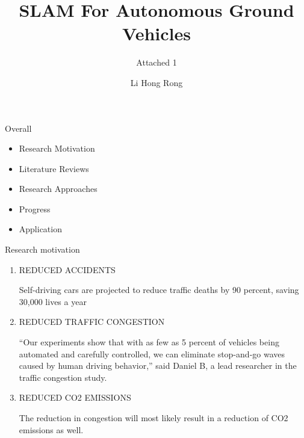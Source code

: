 \documentclass{beamer}
\title{SLAM For Autonomous Ground Vehicles}
\subtitle{Attached 1}
\author{Li Hong Rong}
\date{}
\begin{document}
\begin{frame}
\titlepage
\end{frame}


\begin{frame}[t]{Overall}
\begin{itemize}
\item Research Motivation
\item Literature Reviews
\item Research Approaches
\item Progress
\item Application
\end{itemize}
\end{frame}

\begin{frame}[t]{Research motivation}
\begin{enumerate}[1.]
\item REDUCED ACCIDENTS\\
\vspace{0.5pt}
\begin{tcolorbox}[colback=green!5!white,colframe=green!75!black]
Self-driving cars are projected to reduce traffic deaths by 90 percent, saving 30,000 lives a year
\end{tcolorbox}
\item REDUCED TRAFFIC CONGESTION\\
\vspace{0.5pt}
\begin{tcolorbox}[colback=green!5!white,colframe=green!75!black]
“Our experiments show that with as few as 5 percent of vehicles being automated and carefully controlled, we can eliminate stop-and-go waves caused by human driving behavior,” said Daniel B, a lead researcher in the traffic congestion study.
\end{tcolorbox}
\item REDUCED CO2 EMISSIONS\\
\vspace{0.5pt}
\begin{tcolorbox}[colback=green!5!white,colframe=green!75!black]
The reduction in congestion will most likely result in a reduction of CO2 emissions as well.
\end{tcolorbox}
\end{enumerate}
\end{frame}
\end{document}
